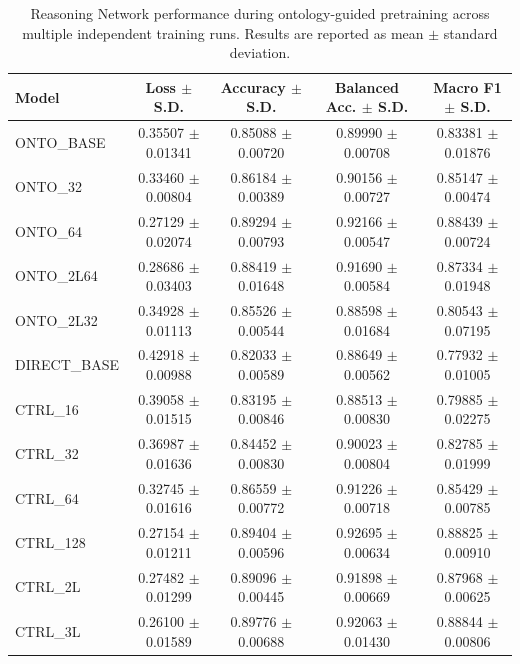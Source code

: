 \begin{table}[t]
\centering
\begin{tabular}{l c c c c}
\toprule
Model & Loss $\pm$ S.D. & Accuracy $\pm$ S.D. & Balanced Acc. $\pm$ S.D. & Macro F1 $\pm$ S.D. \\
\midrule
ONTO\_BASE & 0.35507 $\pm$ 0.01341 & 0.85088 $\pm$ 0.00720 & 0.89990 $\pm$ 0.00708 & 0.83381 $\pm$ 0.01876 \\
ONTO\_32 & 0.33460 $\pm$ 0.00804 & 0.86184 $\pm$ 0.00389 & 0.90156 $\pm$ 0.00727 & 0.85147 $\pm$ 0.00474 \\
ONTO\_64 & 0.27129 $\pm$ 0.02074 & 0.89294 $\pm$ 0.00793 & 0.92166 $\pm$ 0.00547 & 0.88439 $\pm$ 0.00724 \\
ONTO\_2L64 & 0.28686 $\pm$ 0.03403 & 0.88419 $\pm$ 0.01648 & 0.91690 $\pm$ 0.00584 & 0.87334 $\pm$ 0.01948 \\
ONTO\_2L32 & 0.34928 $\pm$ 0.01113 & 0.85526 $\pm$ 0.00544 & 0.88598 $\pm$ 0.01684 & 0.80543 $\pm$ 0.07195 \\
DIRECT\_BASE & 0.42918 $\pm$ 0.00988 & 0.82033 $\pm$ 0.00589 & 0.88649 $\pm$ 0.00562 & 0.77932 $\pm$ 0.01005 \\
CTRL\_16 & 0.39058 $\pm$ 0.01515 & 0.83195 $\pm$ 0.00846 & 0.88513 $\pm$ 0.00830 & 0.79885 $\pm$ 0.02275 \\
CTRL\_32 & 0.36987 $\pm$ 0.01636 & 0.84452 $\pm$ 0.00830 & 0.90023 $\pm$ 0.00804 & 0.82785 $\pm$ 0.01999 \\
CTRL\_64 & 0.32745 $\pm$ 0.01616 & 0.86559 $\pm$ 0.00772 & 0.91226 $\pm$ 0.00718 & 0.85429 $\pm$ 0.00785 \\
CTRL\_128 & 0.27154 $\pm$ 0.01211 & 0.89404 $\pm$ 0.00596 & 0.92695 $\pm$ 0.00634 & 0.88825 $\pm$ 0.00910 \\
CTRL\_2L & 0.27482 $\pm$ 0.01299 & 0.89096 $\pm$ 0.00445 & 0.91898 $\pm$ 0.00669 & 0.87968 $\pm$ 0.00625 \\
CTRL\_3L & 0.26100 $\pm$ 0.01589 & 0.89776 $\pm$ 0.00688 & 0.92063 $\pm$ 0.01430 & 0.88844 $\pm$ 0.00806 \\
\bottomrule
\end{tabular}
\caption{Reasoning Network performance during ontology-guided pretraining across multiple independent training runs. Results are reported as mean $\pm$ standard deviation.}
\label{tab:rn_architecture_pretraining}
\end{table}